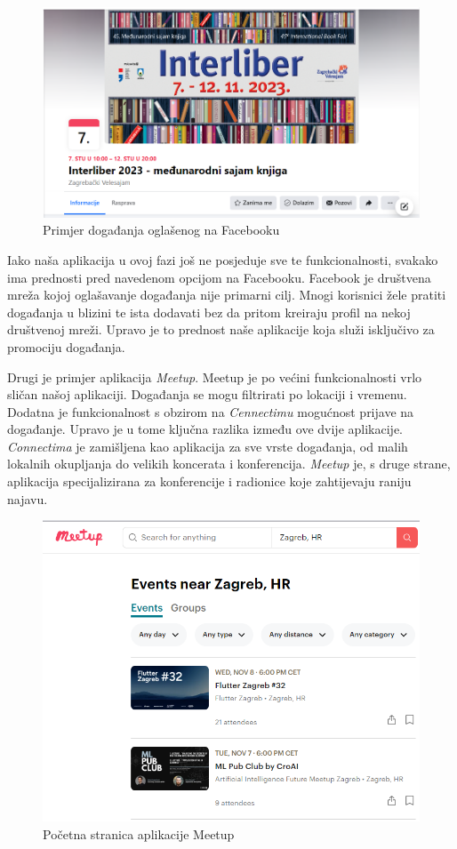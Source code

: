 		 \begin{figure}[H]
		 	\includegraphics[scale=0.7]{slike/Facebook_dogadanja.png}
		 	\centering
		 	\caption{Primjer događanja oglašenog na Facebooku}
		 \end{figure}
		
		Iako naša aplikacija u ovoj fazi još ne posjeduje sve te funkcionalnosti, svakako ima prednosti pred navedenom opcijom na Facebooku. Facebook je društvena mreža kojoj oglašavanje događanja nije primarni cilj. Mnogi korisnici žele pratiti događanja u blizini te ista dodavati bez da pritom kreiraju profil na nekoj društvenoj mreži. Upravo je to prednost naše aplikacije koja služi isključivo za promociju događanja.
				
		Drugi je primjer aplikacija \textit{Meetup}. Meetup je po većini funkcionalnosti vrlo sličan našoj aplikaciji. Događanja se mogu filtrirati po lokaciji i vremenu. Dodatna je funkcionalnost s obzirom na \textit{Cennectimu} mogućnost prijave na događanje. Upravo je u tome ključna razlika između ove dvije aplikacije. \textit{Connectima} je zamišljena kao aplikacija za sve vrste događanja, od malih lokalnih okupljanja do velikih koncerata i konferencija. \textit{Meetup} je, s druge strane, aplikacija specijalizirana za konferencije i radionice koje zahtijevaju raniju najavu.\\
	
		 
		\begin{figure}[H]
			\includegraphics[scale=0.9]{slike/Meetup.png}
			\centering
			\caption{Početna stranica aplikacije Meetup}
		\end{figure}
		
